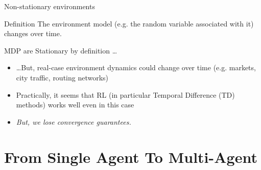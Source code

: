 \documentclass[presentation]{beamer}\mode<presentation>{\usetheme{AMSBolognaFC}}
\begin{document}
\begin{frame}[c]{Non-stationary environments}
	\begin{alertblock}{Definition}
		The environment model (e.g. the random variable associated with it) changes
		over time.
	\end{alertblock}
	\begin{exampleblock}{MDP are Stationary by definition \dots}
		\begin{itemize}
			\item \dots But, real-case environment dynamics could change over time (e.g. markets, city traffic, routing networks)
			\item Practically, it seems that RL (in particular Temporal Difference (TD) methods) works well even in this case
			\item \emph{But, we lose convergence guarantees.}
		\end{itemize}
	\end{exampleblock}
%
\end{frame}

\section{From Single Agent To Multi-Agent}
\end{document}
